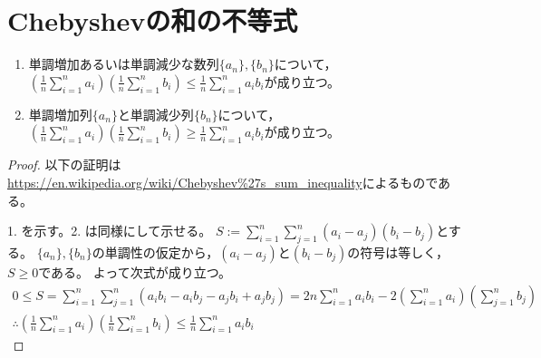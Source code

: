     \section{Chebyshevの和の不等式}
        \label{subsec:Chebyshevの和の不等式}
        \begin{shadebox}
            \begin{enumerate}
                \item 単調増加あるいは単調減少な数列$\{a_n\},\{b_n\}$について，$\left(\frac{1}{n}\sum_{i=1}^n a_i\right)\left(\frac{1}{n}\sum_{i=1}^n b_i\right) \leq \frac{1}{n}\sum_{i=1}^n a_ib_i$が成り立つ。
                \item 単調増加列$\{a_n\}$と単調減少列$\{b_n\}$について，$\left(\frac{1}{n}\sum_{i=1}^n a_i\right)\left(\frac{1}{n}\sum_{i=1}^n b_i\right) \geq \frac{1}{n}\sum_{i=1}^n a_ib_i$が成り立つ。
            \end{enumerate}
        \end{shadebox}
        \begin{proof}
            \quad\par
            以下の証明は\url{https://en.wikipedia.org/wiki/Chebyshev%27s_sum_inequality}によるものである。
            \par
            1. を示す。2. は同様にして示せる。
            $S := \sum_{i=1}^n \sum_{j=1}^n (a_i-a_j)(b_i-b_j)$とする。
            $\{a_n\},\{b_n\}$の単調性の仮定から，$(a_i-a_j)$と$(b_i-b_j)$の符号は等しく，$S\geq 0$である。
            よって次式が成り立つ。
            \begin{gather*}
                0 \leq S = \sum_{i=1}^n \sum_{j=1}^n (a_i b_i - a_i b_j - a_j b_i + a_j b_j) = 2n\sum_{i=1}^n a_i b_i - 2\left(\sum_{i=1}^n a_i\right)\left(\sum_{j=1}^n b_j\right) \\
                \therefore \left(\frac{1}{n}\sum_{i=1}^n a_i\right)\left(\frac{1}{n}\sum_{i=1}^n b_i\right) \leq \frac{1}{n}\sum_{i=1}^n a_ib_i
            \end{gather*}
        \end{proof}
